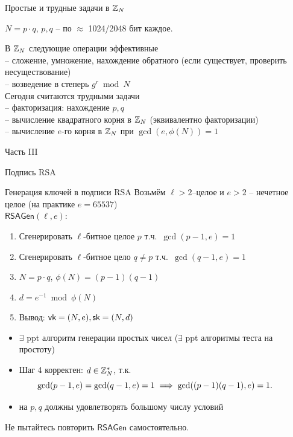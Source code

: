 \documentclass[usenames,dvipsnames,8pt,aspectratio=169]{beamer}
\begin{document}
\begin{frame}{Простые и трудные задачи в ${{\mathbb Z}}_N$}
\Large 
\begin{center}
{\color{Orange}  $N = p \cdot q$},  $p, q$ -- по $\approx$ 1024/2048 бит каждое.\\
\end{center}
В ${{\mathbb Z}}_N$ следующие операции  {\color{Orange} эффективные}  \\[5pt]
-- сложение, умножение, нахождение обратного (если существует, проверить несуществование)\\[3pt]
--  возведение в степерь $g^r \bmod N$ \\[14pt]
Сегодня  {\color{Orange} считаются трудными} задачи \\[5pt]
-- {\color{Orange} факторизация}: нахождение $p, q$  \\[3pt]
-- вычисление квадратного корня в ${{\mathbb Z}}_N$ (эквивалентно факторизации) \\[3pt]
-- вычисление $e$-го корня в  ${{\mathbb Z}}_N$ при $\gcd(e, \phi(N)) = 1$\\
\end{frame}


\begin{frame}
Часть III \\ [10pt]
\begin{LARGE}
	
	\color{Orange}
	\Huge  Подпись RSA
	
\end{LARGE}
\end{frame}



\begin{frame}{Генерация ключей в подписи RSA}
\Large
Возьмём $\ell>2$--целое и $e>2$ -- нечетное целое (на практике  $e=65537$) \\[8pt]
{\color{Orange} $\mathsf{RSAGen}(\ell, e):$}
\begin{enumerate}
	\itemsep5pt
	\item Сгенерировать $\ell$-битное целое $p$ т.ч.\ $\gcd(p-1, e)=1$
	\item Сгенерировать  $\ell$-битное цело $q \neq p$ т.ч.\ $\gcd(q-1, e)=1$
	\item $N= p \cdot q$, $\phi(N) = (p-1)(q-1)$
	\item $d = e^{-1} \bmod \phi(N)$
	\item Вывод: $\textsf{vk} = (N, e), \textsf{sk}=(N, d)$
\end{enumerate}
\large
\pause
\begin{itemize}
	\item  $\exists$ ppt алгоритм генерации простых чисел ($\exists$  ppt алгоритмы теста на простоту)
	\item Шаг 4 корректен:  $d \in {{\mathbb Z}}_N^\ast$, т.к. \[ \hspace{-20pt} \gcd(p-1, e) = \gcd(q-1, e) = 1 \implies \gcd((p-1)(q-1), e)=1.\]
	\item на $p,q$ должны удовлетворять  {\color{Orange} большому числу условий} 
\end{itemize}
\centering
\Large Не пытайтесь повторить $\mathsf{RSAGen}$ самостоятельно. 
\end{frame}
\end{document}
